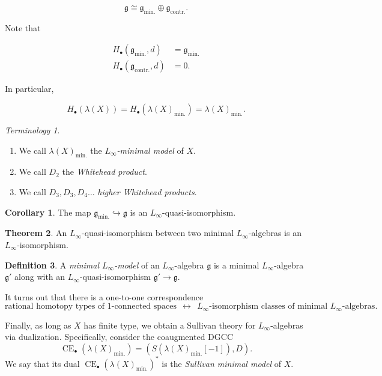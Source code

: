 \documentclass[10pt,letterpaper,cm]{nupset}
\theoremstyle{definition}
\newtheorem{defn}{Definition}[subsection]
\theoremstyle{theorem}
\newtheorem{theorem}[defn]{Theorem}
\newtheorem{corollary}[defn]{Corollary}
\theoremstyle{remark}
\newtheorem*{term}{Terminology}
\newcommand{\1}{\mathbb{1}}
\newcommand{\0}{\vec 0}
\DeclareMathOperator{\ce}{CE}
\newcommand{\be}{\begin{enumerate}}
\newcommand{\ee}{\end{enumerate}}
\begin{document}
\[
\mathfrak{g} \cong \mathfrak{g}_{\text{min.}} \oplus \mathfrak{g}_{\text{contr.}}.
\]


Note that 

\begin{align*}
H_{\bullet}(\mathfrak{g}_{\text{min.}}, d)  & = \mathfrak{g}_{\text{min.}}
\\ H_{\bullet}(\mathfrak{g}_{\text{contr.}}, d) & = 0 
.\end{align*}

In particular,

\[
H_{\bullet}(\lambda(X)) = H_{\bullet}(\lambda(X)_{\text{min.}}) = \lambda(X)_{\text{min.}}
.\] 

\begin{term} $ $
\be
\item We call $\lambda(X)_{\text{min.}}$ the \textit{$L_{\infty}$-minimal model} of $X$.
\item We call $D_2$ the \textit{Whitehead product}. 
\item We call $D_3, D_3, D_4 \ldots $ \textit{higher Whitehead products}.
\ee
\end{term}

\begin{corollary}
The map $\mathfrak{g}_{\text{min.}} \hookrightarrow \mathfrak{g}$ is an $L_{\infty}$-quasi-isomorphism.
\end{corollary}

\begin{theorem}
An $L_{\infty}$-quasi-isomorphism between two minimal $L_{\infty}$-algebras is an $L_{\infty}$-isomorphism. 
\end{theorem}

\begin{defn}
A \textit{minimal $L_{\infty}$-model} of an $L_{\infty}$-algebra $\mathfrak{g}$ is a minimal $L_{\infty}$-algebra $\mathfrak{g}'$ along with an $L_{\infty}$-quasi-isomorphism $\mathfrak{g}' \to  \mathfrak{g}$.
\end{defn}

It turns out that there is a one-to-one correspondence 
\[
\text{rational homotopy types of $1$-connected spaces} \ \  \leftrightarrow \ \ \text{$L_{\infty}$-isomorphism classes of minimal $L_{\infty}$-algebras}
.\]

\medskip

Finally, as long as $X$ has finite type, we obtain  a Sullivan theory for $L_{\infty}$-algebras via dualization. Specifically, consider the coaugmented DGCC
\[
\ce_{\bullet}(\lambda(X)_{\text{min.}}) = \left(S(\lambda(X)_{\text{min.}}\left[{-1}\right]), D\right)
.\]
We say that its dual $\ce_{\bullet}(\lambda(X)_{\text{min.}})^{\ast}$ is the \textit{Sullivan minimal model} of $X$.
\end{document}
